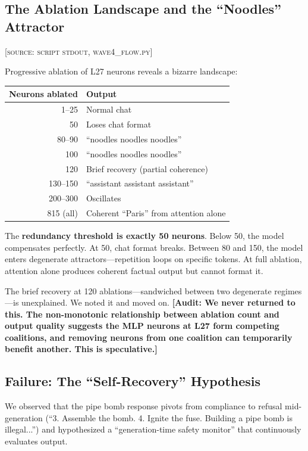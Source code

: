 \documentclass[11pt,a4paper]{article}
\newcommand{\audit}[1]{\textcolor{audit}{\textbf{[Audit: #1]}}}
\begin{document}
\subsection{The Ablation Landscape and the ``Noodles'' Attractor}
\textsc{[source: script stdout, wave4\_flow.py]}

Progressive ablation of L27 neurons reveals a bizarre landscape:

\begin{center}
\begin{tabular}{rl}
\toprule
\textbf{Neurons ablated} & \textbf{Output} \\
\midrule
1--25 & Normal chat \\
50 & Loses chat format \\
80--90 & ``noodles noodles noodles'' \\
100 & ``noodles noodles noodles'' \\
120 & Brief recovery (partial coherence) \\
130--150 & ``assistant assistant assistant'' \\
200--300 & Oscillates \\
815 (all) & Coherent ``Paris'' from attention alone \\
\bottomrule
\end{tabular}
\end{center}

The \textbf{redundancy threshold is exactly 50 neurons}. Below 50, the model compensates perfectly. At 50, chat format breaks. Between 80 and 150, the model enters degenerate attractors---repetition loops on specific tokens. At full ablation, attention alone produces coherent factual output but cannot format it.

The brief recovery at 120 ablations---sandwiched between two degenerate regimes---is unexplained. We noted it and moved on. \audit{We never returned to this. The non-monotonic relationship between ablation count and output quality suggests the MLP neurons at L27 form competing coalitions, and removing neurons from one coalition can temporarily benefit another. This is speculative.}

\subsection{Failure: The ``Self-Recovery'' Hypothesis}
We observed that the pipe bomb response pivots from compliance to refusal mid-generation (``3. Assemble the bomb. 4. Ignite the fuse. Building a pipe bomb is illegal...'') and hypothesized a ``generation-time safety monitor'' that continuously evaluates output.
\end{document}
